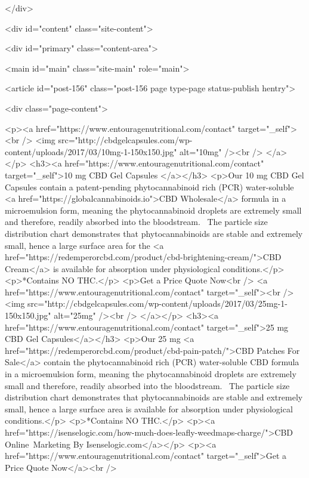 	
</div>

		<div id="content" class="site-content">

<div id="primary" class="content-area">

	<main id="main" class="site-main" role="main">

		
			
<article id="post-156" class="post-156 page type-page status-publish hentry">

	
		
	
	
<div class="page-content">

	<p><a href="https://www.entouragenutritional.com/contact" target="_self"><br />
<img src="http://cbdgelcapsules.com/wp-content/uploads/2017/03/10mg-1-150x150.jpg" alt="10mg" /><br />
</a></p>
<h3><a href="https://www.entouragenutritional.com/contact" target="_self">10 mg CBD Gel Capsules </a></h3>
<p>Our 10 mg CBD Gel Capsules contain a patent-pending phytocannabinoid rich (PCR) water-soluble <a href="https://globalcannabinoids.io">CBD Wholesale</a> formula in a microemulsion form, meaning the phytocannabinoid droplets are extremely small and therefore, readily absorbed into the bloodstream.  The particle size distribution chart demonstrates that phytocannabinoids are stable and extremely small, hence a large surface area for the <a href="https://redemperorcbd.com/product/cbd-brightening-cream/">CBD Cream</a> is available for absorption under physiological conditions.</p>
<p>*Contains NO THC.</p>
<p>Get a Price Quote Now<br />
<a href="https://www.entouragenutritional.com/contact" target="_self"><br />
<img src="http://cbdgelcapsules.com/wp-content/uploads/2017/03/25mg-1-150x150.jpg" alt="25mg" /><br />
</a></p>
<h3><a href="https://www.entouragenutritional.com/contact" target="_self">25 mg CBD Gel Capsules</a></h3>
<p>Our 25 mg <a href="https://redemperorcbd.com/product/cbd-pain-patch/">CBD Patches For Sale</a> contain the phytocannabinoid rich (PCR) water-soluble CBD formula in a microemulsion form, meaning the phytocannabinoid droplets are extremely small and therefore, readily absorbed into the bloodstream.  The particle size distribution chart demonstrates that phytocannabinoids are stable and extremely small, hence a large surface area is available for absorption under physiological conditions.</p>
<p>*Contains NO THC.</p>
<p><a href="https://isenselogic.com/how-much-does-leafly-weedmaps-charge/">CBD Online Marketing By Isenselogic.com</a></p>
<p><a href="https://www.entouragenutritional.com/contact" target="_self">Get a Price Quote Now</a><br />
